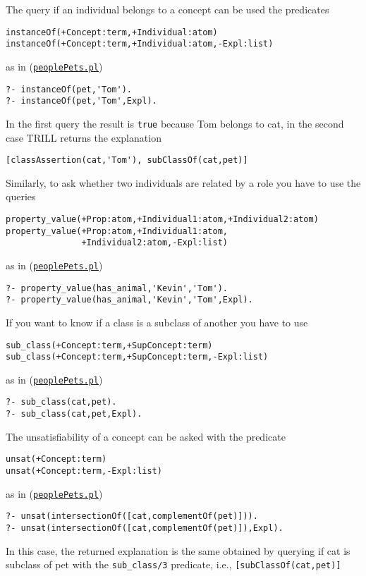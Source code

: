 The query if an individual belongs to a concept can be used the predicates
\begin{verbatim}
instanceOf(+Concept:term,+Individual:atom)
instanceOf(+Concept:term,+Individual:atom,-Expl:list)
\end{verbatim}
as in (\href{http://trill.lamping.unife.it/example/trill/peoplePets.pl}{\texttt{peoplePets.pl}})
\begin{verbatim}
?- instanceOf(pet,'Tom').
?- instanceOf(pet,'Tom',Expl).
\end{verbatim}
In the first query the result is \verb|true| because Tom belongs to cat, in the second case TRILL returns the explanation 
\begin{verbatim}
[classAssertion(cat,'Tom'), subClassOf(cat,pet)]
\end{verbatim}


Similarly, to ask whether two individuals are related by a role you have to use the queries
\begin{verbatim}
property_value(+Prop:atom,+Individual1:atom,+Individual2:atom)
property_value(+Prop:atom,+Individual1:atom,
               +Individual2:atom,-Expl:list)
\end{verbatim}
as in (\href{http://trill.lamping.unife.it/example/trill/peoplePets.pl}{\texttt{peoplePets.pl}})
\begin{verbatim}
?- property_value(has_animal,'Kevin','Tom').
?- property_value(has_animal,'Kevin','Tom',Expl).
\end{verbatim}

If you want to know if a class is a subclass of another you have to use
\begin{verbatim}
sub_class(+Concept:term,+SupConcept:term)
sub_class(+Concept:term,+SupConcept:term,-Expl:list)
\end{verbatim}
as in (\href{http://trill.lamping.unife.it/example/trill/peoplePets.pl}{\texttt{peoplePets.pl}})
\begin{verbatim}
?- sub_class(cat,pet).
?- sub_class(cat,pet,Expl).
\end{verbatim}

The unsatisfiability of a concept can be asked with the predicate
\begin{verbatim}
unsat(+Concept:term)
unsat(+Concept:term,-Expl:list)
\end{verbatim}
as in (\href{http://trill.lamping.unife.it/example/trill/peoplePets.pl}{\texttt{peoplePets.pl}})
\begin{verbatim}
?- unsat(intersectionOf([cat,complementOf(pet)])).
?- unsat(intersectionOf([cat,complementOf(pet)]),Expl).
\end{verbatim}
In this case, the returned explanation is the same obtained by querying if cat is subclass of pet with the \verb|sub_class/3| predicate, i.e., \verb|[subClassOf(cat,pet)]|

